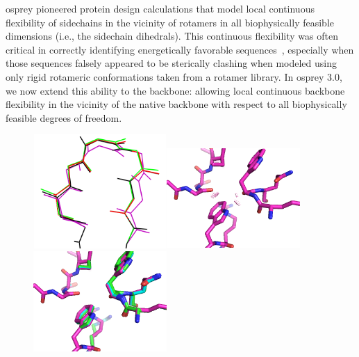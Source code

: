 {\sc osprey} pioneered protein design calculations that model local continuous flexibility of sidechains in the vicinity of rotamers in all biophysically feasible dimensions (i.e., the sidechain dihedrals).  This continuous flexibility was often critical in correctly identifying energetically favorable sequences~\cite{iMinDEE}, especially when those sequences falsely appeared to be sterically clashing when modeled using only rigid rotameric conformations taken from a rotamer library.  In {\sc osprey} 3.0, we now extend this ability to the backbone: allowing local continuous backbone flexibility in the vicinity of the native backbone with respect to all biophysically feasible degrees of freedom.  

\begin{figure}
\includegraphics[width=2in,height=1.7in]{figures/cats_confs.png}\hspace{0.2in}\includegraphics[width=2in,height=1.5in]{figures/w54_rigidBB_clashes.png}\hspace{0.2in}\includegraphics[width=2in,height=1.5in]{figures/w54_overlay.png}

\end{figure}
